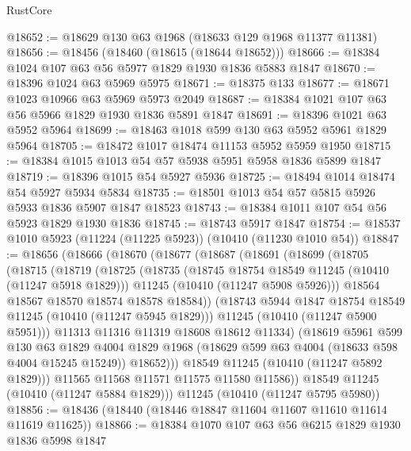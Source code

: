 \begin{lexlean}{RustCore}
\begin{coremodule}
@18652 := @18629 @130 @63 @1968 (@18633 @129 @1968 @11377 @11381)
@18656 := @18456 (@18460 (@18615 (@18644 @18652)))
@18666 := @18384 @1024 @107 @63 @56 @5977 @1829 @1930 @1836 @5883 @1847
@18670 := @18396 @1024 @63 @5969 @5975
@18671 := @18375 @133
@18677 := @18671 @1023 @10966 @63 @5969 @5973 @2049
@18687 := @18384 @1021 @107 @63 @56 @5966 @1829 @1930 @1836 @5891 @1847
@18691 := @18396 @1021 @63 @5952 @5964
@18699 := @18463 @1018 @599 @130 @63 @5952 @5961 @1829 @5964
@18705 := @18472 @1017 @18474 @11153 @5952 @5959 @1950
@18715 := @18384 @1015 @1013 @54 @57 @5938 @5951 @5958 @1836 @5899 @1847
@18719 := @18396 @1015 @54 @5927 @5936
@18725 := @18494 @1014 @18474 @54 @5927 @5934 @5834
@18735 := @18501 @1013 @54 @57 @5815 @5926 @5933 @1836 @5907 @1847 @18523
@18743 := @18384 @1011 @107 @54 @56 @5923 @1829 @1930 @1836
@18745 := @18743 @5917 @1847
@18754 := @18537 @1010 @5923 (@11224 (@11225 @5923)) (@10410 (@11230 @1010 @54))
@18847 := @18656
    (@18666
      (@18670
        (@18677
          (@18687
            (@18691
              (@18699
                (@18705
                  (@18715
                    (@18719
                      (@18725
                        (@18735
                          (@18745 @18754 @18549 @11245 (@10410 (@11247 @5918 @1829)))
                          @11245
                          (@10410 (@11247 @5908 @5926)))
                        @18564
                        @18567
                        @18570
                        @18574
                        @18578
                        @18584))
                    (@18743 @5944 @1847 @18754 @18549 @11245 (@10410 (@11247 @5945 @1829)))
                    @11245
                    (@10410 (@11247 @5900 @5951)))
                  @11313
                  @11316
                  @11319
                  @18608
                  @18612
                  @11334)
                (@18619
                  @5961
                  @599
                  @130
                  @63
                  @1829
                  @4004
                  @1829
                  @1968
                  (@18629 @599 @63 @4004 (@18633 @598 @4004 @15245 @15249))
                  @18652)))
            @18549
            @11245
            (@10410 (@11247 @5892 @1829)))
          @11565
          @11568
          @11571
          @11575
          @11580
          @11586))
      @18549
      @11245
      (@10410 (@11247 @5884 @1829)))
    @11245
    (@10410 (@11247 @5795 @5980))
@18856 := @18436 (@18440 (@18446 @18847 @11604 @11607 @11610 @11614 @11619 @11625))
@18866 := @18384 @1070 @107 @63 @56 @6215 @1829 @1930 @1836 @5998 @1847

\end{coremodule}
\end{lexlean}
